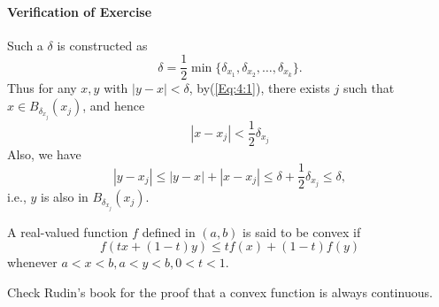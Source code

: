 \paragraph{Verification of Exercise}
Such a $\delta$ is constructed as
\[
\delta=\frac{1}{2}\min\{\delta_{x_1},\delta_{x_2},\dots,\delta_{x_k}\}.
\]
Thus for any $x,y$ with $|y-x|<\delta$, by(\ref{Eq:4:1}), there exists $j$ such that $x\in B_{\delta_{x_j}}(x_j)$, and hence
\begin{equation}
|x -x_j|<\frac{1}{2}\delta_{x_j}
\end{equation}
Also, we have
\begin{equation}
|y-x_j|\le|y-x|+|x-x_j|\le\delta + \frac{1}{2}\delta_{x_j}\le\delta,
\end{equation}
i.e., $y$ is also in $B_{\delta_{x_j}}(x_j)$.





\begin{definition}[Convex]
A real-valued function $f$ defined in $(a,b)$ is said to be convex if 
\[
f(tx+(1-t)y)\le tf(x)+(1-t)f(y)
\]
whenever $a<x<b,a<y<b,0<t<1$.
\end{definition}
Check Rudin's book for the proof that a convex function is always continuous.



%
%

















